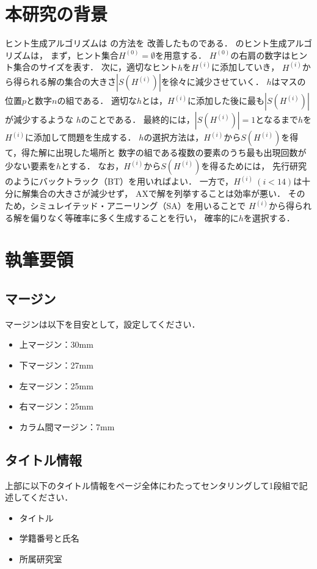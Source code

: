 \documentclass[a4paper, 9pt]{jarticle}
\begin{document}
\begin{論文概要}
\section{本研究の背景}
ヒント生成アルゴリズムは \cite{previous_research} の方法を
改善したものである．\cite{previous_research} のヒント生成アルゴリズムは，
まず，ヒント集合$H^{(0)} = \emptyset$を用意する．
$H^{(0)}$の右肩の数字はヒント集合のサイズを表す．
次に，適切なヒント$h$を$H^{(i)}$に添加していき，
$H^{(i)}$から得られる解の集合の大きさ$|S(H^{(i)})|$を徐々に減少させていく．
$h$はマスの位置$p$と数字$n$の組である．
適切な$h$とは，$H^{(i)}$に添加した後に最も$|S(H^{(i)})|$が減少するような
$h$のことである．
最終的には，$|S(H^{(i)})| = 1$となるまで$h$を$H^{(i)}$に添加して問題を生成する．
$h$の選択方法は，$H^{(i)}$から$S(H^{(i)})$を得て，得た解に出現した場所と
数字の組である複数の要素のうち最も出現回数が少ない要素を$h$とする．
なお，$H^{(i)}$から$S(H^{(i)})$を得るためには，
先行研究のようにバックトラック（BT）を用いればよい．
一方で，$H^{(i)} ~ (i < 14)$は十分に解集合の大きさが減少せず，
AXで解を列挙することは効率が悪い．
そのため，シミュレイテッド・アニーリング（SA）を用いることで
$H^{(i)}$から得られる解を偏りなく等確率に多く生成することを行い，
確率的に$h$を選択する．

\section{執筆要領}

\subsection{マージン}
マージンは以下を目安として，設定してください．

\begin{itemize}
\item 上マージン：30mm
\item 下マージン：27mm
\item 左マージン：25mm
\item 右マージン：25mm
\item カラム間マージン：7mm
\end{itemize}

\subsection{タイトル情報}
上部に以下のタイトル情報をページ全体にわたってセンタリングして1段組で記述してください．

\begin{itemize}
\item タイトル
\item 学籍番号と氏名
\item 所属研究室
\end{itemize}


\end{論文概要}
\end{document}
